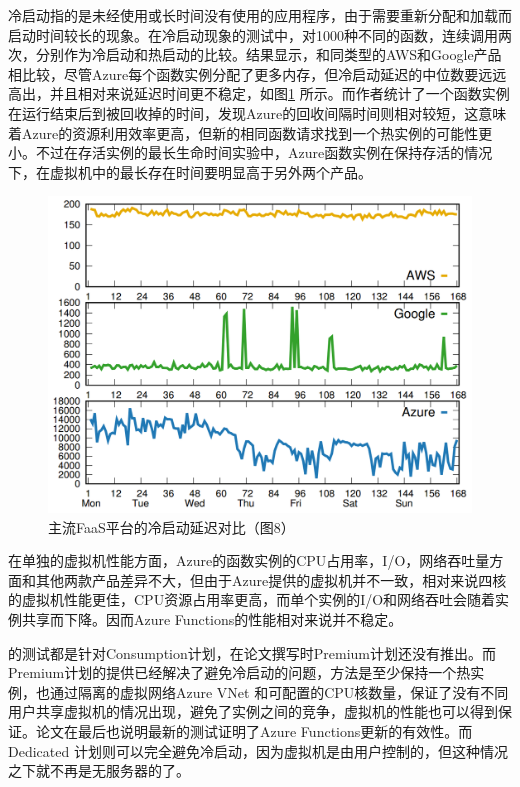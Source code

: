 \documentclass[11pt]{article}
\begin{document}
冷启动指的是未经使用或长时间没有使用的应用程序，由于需要重新分配和加载而启动时间较长的现象。在冷启动现象的测试中，\cite{wang2018peeking}对1000种不同的函数，连续调用两次，分别作为冷启动和热启动的比较。结果显示，和同类型的AWS和Google产品相比较，尽管Azure每个函数实例分配了更多内存，但冷启动延迟的中位数要远远高出，并且相对来说延迟时间更不稳定，如图\ref{figs:cold} 所示。而作者统计了一个函数实例在运行结束后到被回收掉的时间，发现Azure的回收间隔时间则相对较短，这意味着Azure的资源利用效率更高，但新的相同函数请求找到一个热实例的可能性更小。不过在存活实例的最长生命时间实验中，Azure函数实例在保持存活的情况下，在虚拟机中的最长存在时间要明显高于另外两个产品。
\begin{figure}[!htbp]
	\centering
	\includegraphics[scale=0.5]{figs/ColdStart.PNG}
	\caption{主流FaaS平台的冷启动延迟对比（\cite{wang2018peeking}图8）}
	\label{figs:cold}
\end{figure}
在单独的虚拟机性能方面，Azure的函数实例的CPU占用率，I/O，网络吞吐量方面和其他两款产品差异不大，但由于Azure提供的虚拟机并不一致，相对来说四核的虚拟机性能更佳，CPU资源占用率更高，而单个实例的I/O和网络吞吐会随着实例共享而下降。因而Azure Functions的性能相对来说并不稳定。

\cite{wang2018peeking}的测试都是针对Consumption计划，在论文撰写时Premium计划还没有推出。而Premium计划的提供已经解决了避免冷启动的问题，方法是至少保持一个热实例，也通过隔离的虚拟网络Azure VNet 和可配置的CPU核数量，保证了没有不同用户共享虚拟机的情况出现，避免了实例之间的竞争，虚拟机的性能也可以得到保证。论文在最后也说明最新的测试证明了Azure Functions更新的有效性。而Dedicated 计划则可以完全避免冷启动，因为虚拟机是由用户控制的，但这种情况之下就不再是无服务器的了。
\end{document}
